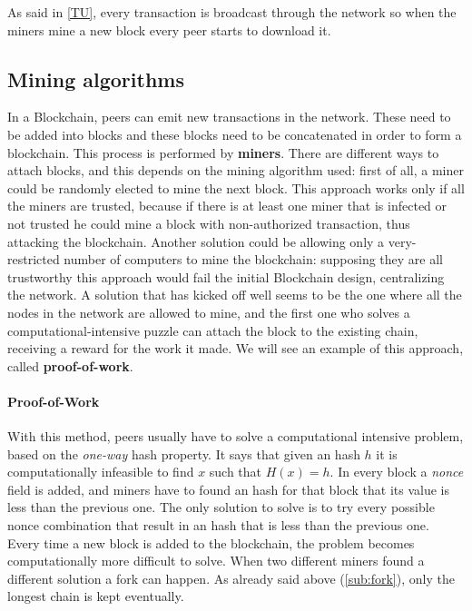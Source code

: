 As said in \ref{TU}, every transaction is broadcast through the network so when
the miners mine a new block every peer starts to download it.

\subsection{Mining algorithms}
In a Blockchain, peers can emit new transactions in the network. These
need to be added into blocks and these blocks need to be concatenated in order
to form a blockchain. This process is performed by \textbf{miners}.
There are different ways to attach blocks, and this depends on the mining
algorithm used: first of all, a miner could be randomly elected to mine the
next block. This approach works only if all the miners are trusted, because if
there is at least one miner that is infected or not trusted he could mine a
block with non-authorized transaction, thus attacking the blockchain. Another
solution could be allowing only a very-restricted number of computers to mine
the blockchain: supposing they are all trustworthy this approach would fail the
initial Blockchain design, centralizing the network.
A solution that has kicked off well seems to be the one where all the nodes in
the network are allowed to mine, and the first one who solves a
computational-intensive puzzle can attach the block to the existing chain,
receiving a reward for the work it made. We will see an example of this
approach, called \textbf{proof-of-work}.


\paragraph{Proof-of-Work}

With this method, peers usually have to solve a computational 
intensive problem, based on the \textit{one-way} hash property. It says that 
given an hash $h$ it is computationally infeasible to find $x$ such that $H(x) 
= h$.
In every block a \textit{nonce} field is added, and miners have to found an
hash for that block that its value is less than the previous one\cite{sok15}.
The only solution to solve is to try every possible nonce combination that
result in an hash that is less than the previous one. Every time a new block is
added to the blockchain, the problem becomes computationally more difficult to
solve.
When two different miners found a different solution a fork can happen. As
already said above (\ref{sub:fork}), only the longest chain is kept eventually.

